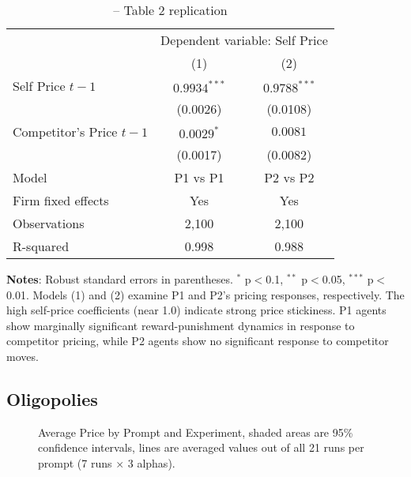\begin{table}[htpb!]
    \centering
    \caption{\textcite[p. 18]{fish_algorithmic_2025} -- Table 2 replication}
    \label{tab:fe_fish}
    \begin{threeparttable}
    {\small
    \begin{tabular}{lcc}
    \toprule
    & \multicolumn{2}{c}{Dependent variable: Self Price} \\
    \cmidrule(lr){2-3}
    & (1) & (2) \\
    \midrule
    Self Price $t-1$                      & $0.9934^{***}$ & $0.9788^{***}$ \\
                                         & (0.0026)       & (0.0108)       \\
    Competitor's Price $t-1$             & $0.0029^{*}$   & $0.0081$       \\
                                         & (0.0017)       & (0.0082)       \\
    \midrule
    Model                                & P1 vs P1       & P2 vs P2       \\          
    Firm fixed effects                   & Yes            & Yes            \\
    \midrule
    Observations                         & 2,100          & 2,100          \\
    R-squared                           & 0.998          & 0.988          \\
    \bottomrule
    \end{tabular}
    }
    \begin{tablenotes}[flushleft]
    \footnotesize
    \item \textbf{Notes}: Robust standard errors in parentheses. $^{*}$ p$<$0.1, $^{**}$ p$<$0.05, $^{***}$ p$<$0.01. Models (1) and (2) examine P1 and P2's pricing responses, respectively. The high self-price coefficients (near 1.0) indicate strong price stickiness. P1 agents show marginally significant reward-punishment dynamics in response to competitor pricing, while P2 agents show no significant response to competitor moves.
    \end{tablenotes}
    \end{threeparttable}
\end{table}


\subsection{Oligopolies}

\begin{figure}[htpb]
    \centering
    
    \caption{Average Price by Prompt and Experiment, shaded areas are 95\% confidence intervals, lines are averaged values out of all 21 runs per prompt (7 runs $\times$ 3 alphas).}
    \label{fig:ts_prices_comb}
\end{figure}


